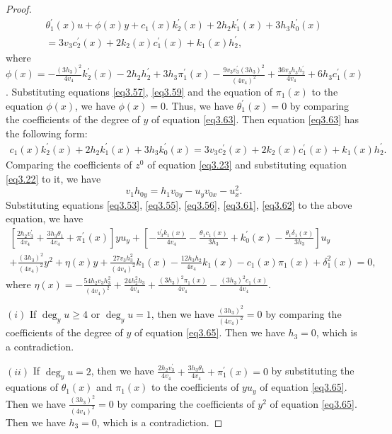 \documentclass[12pt, twoside, leqno]{article}
\theoremstyle{definition}
\numberwithin{equation}{section}
\begin{document}
\begin{proof}
\begin{equation}\label{eq3.63}
\begin{split}
\theta_{1}^{'}(x)u+\phi(x)y+c_{1}(x)k_{2}^{'}(x)+2h_{2}k_{1}^{'}(x)+3h_{3}k_{0}^{'}(x)\\
=3v_{3}c_{2}^{'}(x)+2k_{2}(x)c_{1}^{'}(x)+k_{1}(x)h_{2}^{'},
\end{split}
\end{equation}
where $\phi(x)=-\frac{(3h_3)^2}{4v_4}k_2^{'}(x)-2h_2h_2^{'}+3h_3\pi_1^{'}(x)-\frac{9v_3v_3^{'}(3h_3)^2}{(4v_4)^2}+\frac{36v_3h_3h_2^{'}}{4v_4}+6h_3c_1^{'}(x)$.
Substituting equations \eqref{eq3.57}, \eqref{eq3.59} and the equation of $\pi_1(x)$ to the equation $\phi(x)$, we have $\phi(x)=0$. Thus, we have $\theta_{1}^{'}(x)=0$ by comparing the coefficients of the degree of $y$ of equation \eqref{eq3.63}. Then equation \eqref{eq3.63} has the following form:
\begin{equation}\label{eq3.64}
\begin{split}
c_{1}(x)k_{2}^{'}(x)+2h_{2}k_{1}^{'}(x)+3h_{3}k_{0}^{'}(x)
=3v_{3}c_{2}^{'}(x)+2k_{2}(x)c_{1}^{'}(x)+k_{1}(x)h_{2}^{'}.
\end{split}
\end{equation}
Comparing the coefficients of $z^0$ of equation \eqref{eq3.23} and substituting equation \eqref{eq3.22} to it, we have
$$v_1h_{0y}=h_1v_{0y}-u_yv_{0x}-u_x^2.$$
Substituting equations \eqref{eq3.53}, \eqref{eq3.55}, \eqref{eq3.56}, \eqref{eq3.61}, \eqref{eq3.62} to the above equation, we have
\begin{equation}\label{eq3.65}
\begin{split}
\left[\frac{2h_2v_3^{'}}{4v_4}+\frac{3h_3\theta_1}{4v_4}+\pi_1^{'}(x)\right]yu_y+\left[-\frac{v_3^{'}k_1(x)}{4v_4}-\frac{\theta_1c_1(x)}{3h_3}+k_0^{'}(x)-\frac{\theta_1\delta_1(x)}{3h_3}\right]u_y\\
+\frac{(3h_3)^2}{(4v_4)^2}y^2+\eta(x)y+\frac{27v_3h_3^2}{(4v_4)^2}k_1(x)-\frac{12h_3h_2}{4v_4}k_1(x)-c_1(x)\pi_1(x)+\delta_1^2(x)=0,
\end{split}
\end{equation}
where $\eta(x)=-\frac{54h_2v_3h_3^2}{(4v_4)^2}+\frac{24h_2^2h_3}{4v_4}+\frac{(3h_3)^2\pi_1(x)}{4v_4}-\frac{(3h_3)^2c_1(x)}{4v_4}$.

$(i)$ If $\deg_yu\geq 4$ or $\deg_yu=1$, then we have $\frac{(3h_3)^2}{(4v_4)^2}=0$ by comparing the coefficients of the degree of $y$ of equation \eqref{eq3.65}. Then we have $h_3=0$, which is a contradiction.

$(ii)$ If $\deg_yu=2$, then we have $\frac{2h_2v_3^{'}}{4v_4}+\frac{3h_3\theta_1}{4v_4}+\pi_1^{'}(x)=0$ by substituting the equations of $\theta_1(x)$ and $\pi_1(x)$ to the coefficients of $yu_y$ of equation \eqref{eq3.65}. Then we have $\frac{(3h_3)^2}{(4v_4)^2}=0$ by comparing the coefficients of $y^2$ of equation \eqref{eq3.65}. Then we have $h_3=0$, which is a contradiction.


\end{proof}
\end{document}
